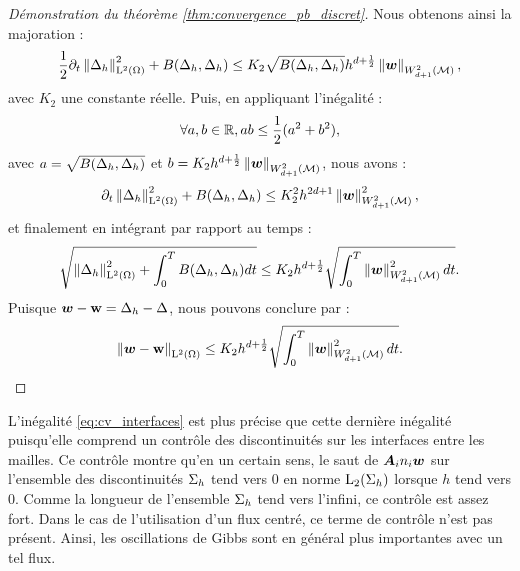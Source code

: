 \begin{proof}[Démonstration du théorème \ref{thm:convergence_pb_discret}]
	Nous obtenons ainsi la majoration :
	\begin{align}
		\frac{1}{2} \partial_{t} \left\Vert\Delta_h\right\Vert_{\mathrm{L}^2(\Omega)}^2
		+ B(\Delta_h,\Delta_h)
		\le K_2 \sqrt{B(\Delta_h,\Delta_h)} 
		h^{d + \frac{1}{2}}
		\left\Vert\bm{w}\right\Vert_{W_{d + 1}^{2}(\mathcal{M})} ,
	\end{align}
	avec $K_2$ une constante réelle. Puis, en appliquant l'inégalité :
	\begin{align}
		\forall a, b \in \mathbb{R}, a b \le \frac{1}{2} (a^2 + b^2) ,
	\end{align}
	avec $a = \sqrt{B(\Delta_h,\Delta_h)}$ et
	$b = K_2 h^{d + \frac{1}{2}} \left\Vert\bm{w}\right\Vert_{W_{d + 1}^{2}(\mathcal{M})}$,
	nous avons :
	\begin{align}
		\partial_{t} \left\Vert\Delta_h\right\Vert_{\mathrm{L}^2(\Omega)}^2
		+ B(\Delta_h,\Delta_h)
		\le K_2^2 h^{2 d + 1}
		\left\Vert\bm{w}\right\Vert_{W_{d + 1}^{2}(\mathcal{M})}^2 ,
	\end{align}
	et finalement en intégrant par rapport au temps :
	\begin{align}
		\sqrt{\left\Vert\Delta_h\right\Vert_{\mathrm{L}^2(\Omega)}^2 +
		\int_{0}^{T} B(\Delta_h,\Delta_h) dt}
		\le K_2 h^{d + \frac{1}{2}}
		\sqrt{\int_{0}^{T} \left\Vert\bm{w}\right\Vert_{W_{d + 1}^{2}(\mathcal{M})}^2 dt}
		\label{eq:cv_interfaces} .
	\end{align}
	Puisque $\bm{w} - \bm{\mathrm{w}} = \Delta_h - \Delta$,%
	nous pouvons conclure par :
	\begin{align}
		\left\Vert\bm{w} - \bm{\mathrm{w}}\right\Vert_{\mathrm{L}^2(\Omega)}
		\le K_2 h^{d + \frac{1}{2}}
		\sqrt{\int_{0}^{T} \left\Vert\bm{w}\right\Vert_{W_{d + 1}^{2}(\mathcal{M})}^2 dt} .
	\end{align}
\end{proof}

\begin{remark}
	L’inégalité \eqref{eq:cv_interfaces} est plus précise
	que cette dernière inégalité
	puisqu’elle comprend un contrôle des discontinuités sur
	les interfaces entre les mailles.
	Ce contrôle montre qu’en un certain sens, le saut de ${\bm{A}_{i}n_{i}} \bm{w}$
	sur l’ensemble des discontinuités $\Sigma_h$ tend vers
	$0$ en norme $\mathrm{L}_2(\Sigma_h)$ lorsque $h$
	tend vers $0$.
	Comme la longueur de l’ensemble $\Sigma_h$ tend vers l’infini,
	ce contrôle est assez fort.
	Dans le cas de l’utilisation d’un flux centré, ce terme
	de contrôle n’est pas présent.
	Ainsi, les oscillations de Gibbs sont en général
	plus importantes avec un tel flux.
\end{remark}





